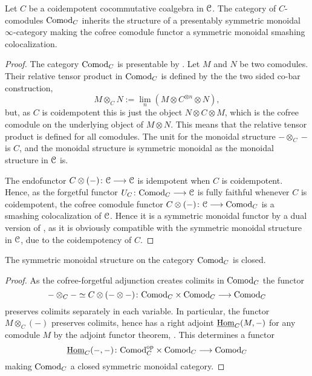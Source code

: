 \begin{lemma}
    \label{ch2:lm:coidempotent-then-comod-monoidal}
    Let $C$ be a coidempotent cocommutative coalgebra in $\EuScript{C}$. The category of $C$-comodules $\mathrm{Comod}_C$ inherits the structure of a presentably symmetric monoidal $\infty$-category making the cofree comodule functor a symmetric monoidal smashing colocalization.
\end{lemma}
\begin{proof}
    The category $\mathrm{Comod}_C$ is presentable by \cite[2.1.11]{peroux_2020}. Let $M$ and $N$ be two comodules. Their relative tensor product in $\mathrm{Comod}_C$ is defined by the the two sided co-bar construction,
    \[M\otimes_C N := \lim_n (M \otimes C^{\otimes n} \otimes N),\]
    but, as $C$ is coidempotent this is just the object $N\otimes C\otimes M$, which is the cofree comodule on the underlying object of $M\otimes N$. This means that the relative tensor product is defined for all comodules. The unit for the monoidal structure $-\otimes_C-$ is $C$, and the monoidal structure is symmetric monoidal as the monoidal structure in $\EuScript{C}$ is. 

    The endofunctor $C\otimes (-)\colon \EuScript{C}\longrightarrow \EuScript{C}$ is idempotent when $C$ is coidempotent. Hence, as the forgetful functor $U_C\colon \mathrm{Comod}_C\longrightarrow \EuScript{C}$ is fully faithful whenever $C$ is coidempotent, the cofree comodule functor $C\otimes (-)\colon \EuScript{C}\longrightarrow \mathrm{Comod}_C$ is a smashing colocalization of $\EuScript{C}$. Hence it is a symmetric monoidal functor by a dual version of \cite[2.2.1.9]{Lurie_HA}, as it is obviously compatible with the symmetric monoidal structure in $\EuScript{C}$, due to the coidempotency of $C$. 
\end{proof}

\begin{lemma}
    The symmetric monoidal structure on the category $\mathrm{Comod}_C$ is closed. 
\end{lemma}
\begin{proof}
    As the cofree-forgetful adjunction creates colimits in $\mathrm{Comod}_C$ the functor 
    \[-\otimes_C- \simeq C\otimes (-\otimes -)\colon \mathrm{Comod}_C \times \mathrm{Comod}_C \longrightarrow \mathrm{Comod}_C\] 
    preserves colimits separately in each variable. In particular, the functor $M\otimes_C (-)$ preserves colimits, hence has a right adjoint $\operatorname{\underline{Hom}}_C(M,-)$ for any comodule $M$ by the adjoint functor theorem, \cite[5.5.2.9]{lurie_09}. This determines a functor 
    \[\operatorname{\underline{Hom}}_C(-,-)\colon \mathrm{Comod}_C^{\mathrm{op}}\times \mathrm{Comod}_C\longrightarrow \mathrm{Comod}_C\]
    making $\mathrm{Comod}_C$ a closed symmetric monoidal category.  
\end{proof}

